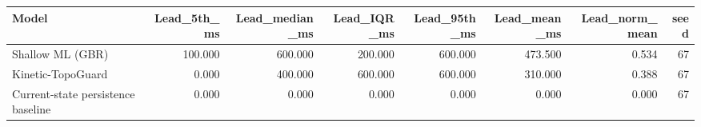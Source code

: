 \begin{tabular}{lrrrrrrr}
\toprule
Model & Lead\_5th\_ms & Lead\_median\_ms & Lead\_IQR\_ms & Lead\_95th\_ms & Lead\_mean\_ms & Lead\_norm\_mean & seed \\
\midrule
Shallow ML (GBR) & 100.000 & 600.000 & 200.000 & 600.000 & 473.500 & 0.534 & 67 \\
Kinetic-TopoGuard & 0.000 & 400.000 & 600.000 & 600.000 & 310.000 & 0.388 & 67 \\
Current-state persistence baseline & 0.000 & 0.000 & 0.000 & 0.000 & 0.000 & 0.000 & 67 \\
\bottomrule
\end{tabular}